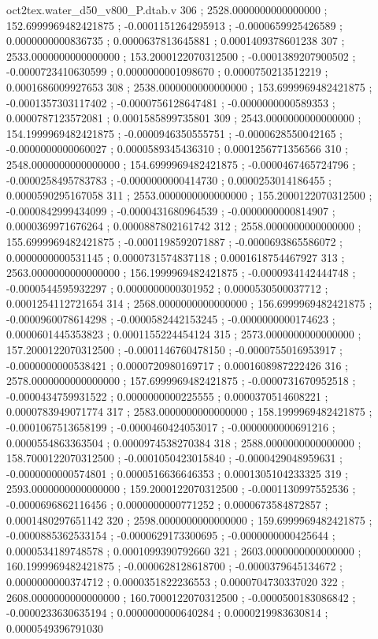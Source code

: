 \begin{filecontents}[overwrite]{oct2tex.water_d50_v800_P.dtab.v}
306 ; 2528.0000000000000000 ; 152.6999969482421875 ; -0.0001151264295913 ; -0.0000659925426589 ; 0.0000000000836735 ; 0.0000637813645881 ; 0.0001409378601238
307 ; 2533.0000000000000000 ; 153.2000122070312500 ; -0.0001389207900502 ; -0.0000723410630599 ; 0.0000000001098670 ; 0.0000750213512219 ; 0.0001686009927653
308 ; 2538.0000000000000000 ; 153.6999969482421875 ; -0.0001357303117402 ; -0.0000756128647481 ; -0.0000000000589353 ; 0.0000787123572081 ; 0.0001585899735801
309 ; 2543.0000000000000000 ; 154.1999969482421875 ; -0.0000946350555751 ; -0.0000628550042165 ; -0.0000000000060027 ; 0.0000589345436310 ; 0.0001256771356566
310 ; 2548.0000000000000000 ; 154.6999969482421875 ; -0.0000467465724796 ; -0.0000258495783783 ; -0.0000000000414730 ; 0.0000253014186455 ; 0.0000590295167058
311 ; 2553.0000000000000000 ; 155.2000122070312500 ; -0.0000842999434099 ; -0.0000431680964539 ; -0.0000000000814907 ; 0.0000369971676264 ; 0.0000887802161742
312 ; 2558.0000000000000000 ; 155.6999969482421875 ; -0.0001198592071887 ; -0.0000693865586072 ; 0.0000000000531145 ; 0.0000731574837118 ; 0.0001618754467927
313 ; 2563.0000000000000000 ; 156.1999969482421875 ; -0.0000934142444748 ; -0.0000544595932297 ; 0.0000000000301952 ; 0.0000530500037712 ; 0.0001254112721654
314 ; 2568.0000000000000000 ; 156.6999969482421875 ; -0.0000960078614298 ; -0.0000582442153245 ; -0.0000000000174623 ; 0.0000601445353823 ; 0.0001155224454124
315 ; 2573.0000000000000000 ; 157.2000122070312500 ; -0.0001146760478150 ; -0.0000755016953917 ; -0.0000000000538421 ; 0.0000720980169717 ; 0.0001608987222426
316 ; 2578.0000000000000000 ; 157.6999969482421875 ; -0.0000731670952518 ; -0.0000434759931522 ; 0.0000000000225555 ; 0.0000370514608221 ; 0.0000783949071774
317 ; 2583.0000000000000000 ; 158.1999969482421875 ; -0.0001067513658199 ; -0.0000460424053017 ; -0.0000000000691216 ; 0.0000554863363504 ; 0.0000974538270384
318 ; 2588.0000000000000000 ; 158.7000122070312500 ; -0.0001050423015840 ; -0.0000429048959631 ; -0.0000000000574801 ; 0.0000516636646353 ; 0.0001305104233325
319 ; 2593.0000000000000000 ; 159.2000122070312500 ; -0.0001130997552536 ; -0.0000696862116456 ; 0.0000000000771252 ; 0.0000673584872857 ; 0.0001480297651142
320 ; 2598.0000000000000000 ; 159.6999969482421875 ; -0.0000885362533154 ; -0.0000629173300695 ; -0.0000000000425644 ; 0.0000534189748578 ; 0.0001099390792660
321 ; 2603.0000000000000000 ; 160.1999969482421875 ; -0.0000628128618700 ; -0.0000379645134672 ; 0.0000000000374712 ; 0.0000351822236553 ; 0.0000704730337020
322 ; 2608.0000000000000000 ; 160.7000122070312500 ; -0.0000500183086842 ; -0.0000233630635194 ; 0.0000000000640284 ; 0.0000219983630814 ; 0.0000549396791030

\end{filecontents}
